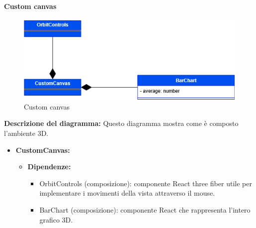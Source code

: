 \paragraph{Custom canvas}
\begin{figure}[h!] \centering
    \includegraphics[scale=0.45]{template/images/uml_front/ui/customcanvas.png}
    \caption{Custom canvas}
\end{figure}
\textbf{Descrizione del diagramma:}
Questo diagramma mostra come è composto l'ambiente 3D.
\begin{itemize}
    \item \textbf{CustomCanvas:}
    \begin{itemize}
        \item \textbf{Dipendenze:}
        \begin{itemize}
            \item OrbitControls (composizione): componente React three fiber utile per implementare i movimenti della vista attraverso il mouse.
            \item BarChart (composizione): componente React che rappresenta l'intero grafico 3D.
        \end{itemize} 
    \end{itemize}
\end{itemize}

\pagebreak


